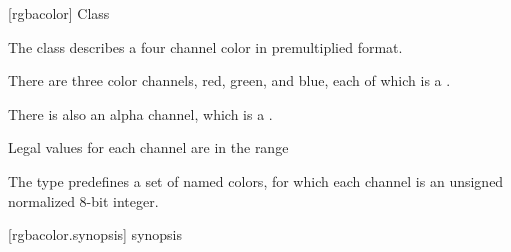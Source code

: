  [rgbacolor] {Class }

\pnum
{}
The class  describes a four channel color in premultiplied format.

\pnum
There are three color channels, red, green, and blue, each of which is a .

\pnum
There is also an alpha channel, which is a .

\pnum
Legal values for each channel are in the range %

\pnum
The type predefines a set of named colors, for which each channel is an unsigned normalized 8-bit integer.

 [rgbacolor.synopsis] { synopsis}

